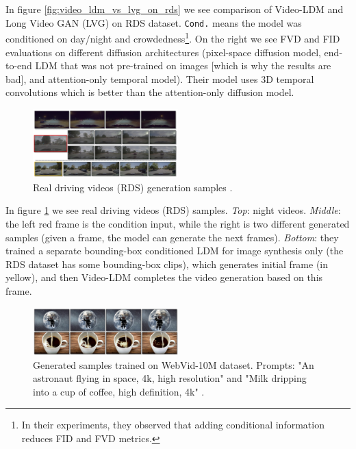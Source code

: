In figure \ref{fig:video_ldm_vs_lvg_on_rds} we see comparison of Video-LDM and Long Video GAN (LVG) on RDS dataset. \texttt{Cond.} means the model was conditioned on day/night and crowdedness\footnote{In their experiments, they observed that adding conditional information reduces FID and FVD metrics.}. On the right we see FVD and FID evaluations on different diffusion architectures (pixel-space diffusion model, end-to-end LDM that was not pre-trained on images [which is why the results are bad], and attention-only temporal model). Their model uses 3D temporal convolutions which is better than the attention-only diffusion model.

\begin{figure}
    \centering
    \includegraphics[width=0.5\textwidth]{images/video_ldm/rds.png}
    \caption{Real driving videos (RDS) generation samples \cite{video_ldm}.}
    \label{fig:video_ldm_rds}
\end{figure}

In figure \ref{fig:video_ldm_rds} we see real driving videos (RDS) samples. \textit{Top}: night videos. \textit{Middle}: the left red frame is the condition input, while the right is two different generated samples (given a frame, the model can generate the next frames). \textit{Bottom}: they trained a separate bounding-box conditioned LDM for image synthesis only (the RDS dataset has some bounding-box clips), which generates initial frame (in yellow), and then Video-LDM completes the video generation based on this frame.

\begin{figure}
    \centering
    \includegraphics[width=0.5\textwidth]{images/video_ldm/webvid_samples.png}
    \caption{Generated samples trained on WebVid-10M dataset. Prompts: "An astronaut flying in space, 4k, high resolution" and "Milk dripping into a cup of coffee, high definition, 4k" \cite{video_ldm}.}
    \label{fig:video_ldm_webvid_samples}
\end{figure}

